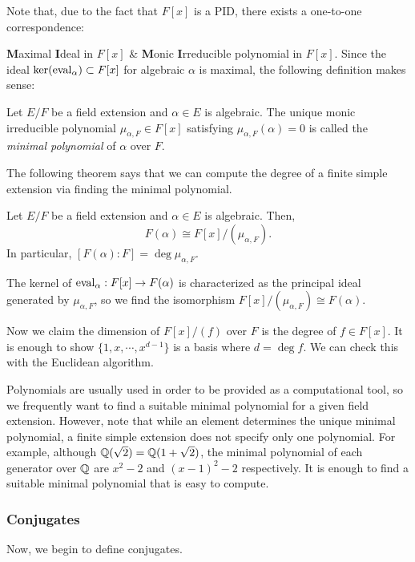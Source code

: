 \documentclass{../exp}
\begin{document}
Note that, due to the fact that $F[x]$ is a PID, there exists a one-to-one correspondence:
\begin{rd}
\textbf{M}aximal \textbf{I}deal in $F[x]$ & \textbf{M}onic \textbf{I}rreducible polynomial in $F[x]$. \]
Since the ideal $\ker(\operatorname{eval}_\alpha)\subset F[x]$ for algebraic $\alpha$ is maximal, the following definition makes sense:

\begin{defn}
Let $E/F$ be a field extension and $\alpha\in E$ is algebraic.
The unique monic irreducible polynomial $\mu_{\alpha,F}\in F[x]$ satisfying $\mu_{\alpha,F}(\alpha)=0$ is called the \emph{minimal polynomial} of $\alpha$ over $F$.
\end{defn}

The following theorem says that we can compute the degree of a finite simple extension via finding the minimal polynomial.
\begin{thm}
Let $E/F$ be a field extension and $\alpha\in E$ is algebraic.
Then,
\[F(\alpha)\cong F[x]/(\mu_{\alpha,F}).\]
In particular, $[F(\alpha):F]=\deg\mu_{\alpha,F}$.
\end{thm}
\begin{pf}
The kernel of $\eval_\alpha:F[x]\to F(\alpha)$ is characterized as the principal ideal generated by $\mu_{\alpha,F}$, so we find the isomorphism $F[x]/(\mu_{\alpha,F})\cong F(\alpha)$.

Now we claim the dimension of $F[x]/(f)$ over $F$ is the degree of $f\in F[x]$.
It is enough to show $\{1,x,\cdots,x^{d-1}\}$ is a basis where $d=\deg f$.
We can check this with the Euclidean algorithm.
\end{pf}
\begin{rmk}
Polynomials are usually used in order to be provided as a computational tool, so we frequently want to find a suitable minimal polynomial for a given field extension.
However, note that while an element determines the unique minimal polynomial, a finite simple extension does not specify only one polynomial.
For example, although $\mathbb{Q}(\sqrt2)=\mathbb{Q}(1+\sqrt2)$, the minimal polynomial of each generator over $\mathbb{Q}$ are $x^2-2$ and $(x-1)^2-2$ respectively.
It is enough to find a suitable minimal polynomial that is easy to compute.
\end{rmk}

\subsubsection{Conjugates}
Now, we begin to define conjugates.


\end{rd}
\end{document}
